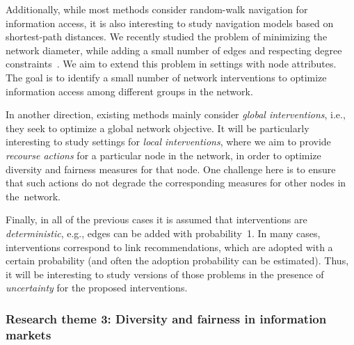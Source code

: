 \documentclass[a4paper,11pt]{article}
\begin{document}
Additionally, while most methods consider random-walk navigation for information access, 
it is also interesting to study navigation models based on shortest-path distances. 
We recently studied the problem of minimizing the network diameter, 
while adding a small number of edges and respecting degree constraints~\cite{adriaens2022diameter}.
We aim to extend this problem in settings with node attributes. 
The goal is to identify a small number of network interventions
to optimize information access among different groups in the network.

In another direction, existing methods mainly consider \emph{global interventions}, 
i.e., they seek to optimize a global network objective. 
It will be particularly interesting to study settings for \emph{local interventions}, 
where we aim to provide \emph{recourse actions} for a particular node in the network, 
in order to optimize diversity and fairness measures for that node. 
One challenge here is to ensure that such actions do not degrade 
the corresponding measures for other nodes in the~network. 

Finally, in all of the previous cases it is assumed that interventions are \emph{deterministic}, 
e.g., edges can be added with probability~1.
In many cases, interventions correspond to link recommendations, 
which are adopted with a certain probability
(and often the adoption probability can be estimated).
Thus, it will be interesting to study versions of those problems
in the presence of \emph{uncertainty} for the proposed interventions.


\vspace{-1mm}
\subsubsection*{Research theme 3: Diversity and fairness in information markets}
\vspace{-1mm}
\end{document}
